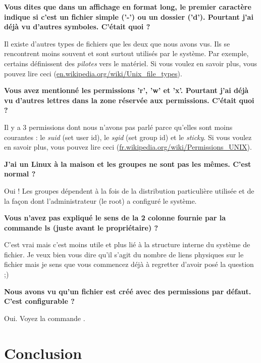 \documentclass[a4paper,11pt]{style-esi/td}
\begin{document}
		\begin{faq}
			\textbf{%
				Vous dites que dans un affichage en format long, 
				le premier caractère indique si c'est un fichier simple ('-') ou un dossier ('d'). 
				Pourtant j'ai déjà vu d'autres symboles. C'était quoi ?
			}
			
			Il existe d'autres types de fichiers que les deux que nous avons vus. 
			Ils se rencontrent moins souvent et sont surtout utilisés par le système.
			Par exemple, certains définissent des \textit{pilotes} vers le matériel. 
			Si vous voulez en savoir plus, vous pouvez lire ceci 
			(\url{en.wikipedia.org/wiki/Unix\_file\_types}).  

			\medskip
			\textbf{%
				Vous avez mentionné les permissions 'r', 'w' et 'x'. 
				Pourtant j'ai déjà vu d'autres lettres dans la zone réservée aux permissions. 
				C'était quoi ?
			}

			Il y a 3 permissions dont nous n'avons pas parlé parce qu'elles sont moins courantes : 
			le \textit{suid} (set user id), le \textit{sgid} (set group id) 
			et le \textit{sticky}. 
			Si vous voulez en savoir plus, vous pouvez lire ceci 
			(\url{fr.wikipedia.org/wiki/Permissions\_UNIX}).  

			\medskip
			\textbf{%
				J'ai un Linux à la maison et les groupes ne sont pas les mêmes. 
				C'est normal ?
			}

			Oui ! 
			Les groupes dépendent à la fois de la distribution particulière utilisée
			et de la façon dont l'administrateur (le root) a configuré le système.   

			\medskip
			\textbf{%
				Vous n'avez pas expliqué le sens de la 2\ieme{} colonne 
				fournie par la commande ls (juste avant le propriétaire) ?
			}

			C'est vrai mais c'est moins utile 
			et plus lié à la structure interne du système de fichier. 
			Je veux bien vous dire qu'il s'agit 
			du nombre de liens physiques sur le fichier 
			mais je sens que vous commencez déjà à regretter d'avoir posé la question ;)  

			\medskip
			\textbf{%
				Nous avons vu qu'un fichier est créé avec des permissions par défaut. 
				C'est configurable ?
			}

			Oui. Voyez la commande .  
		\end{faq}

\section{Conclusion}
\end{document}
